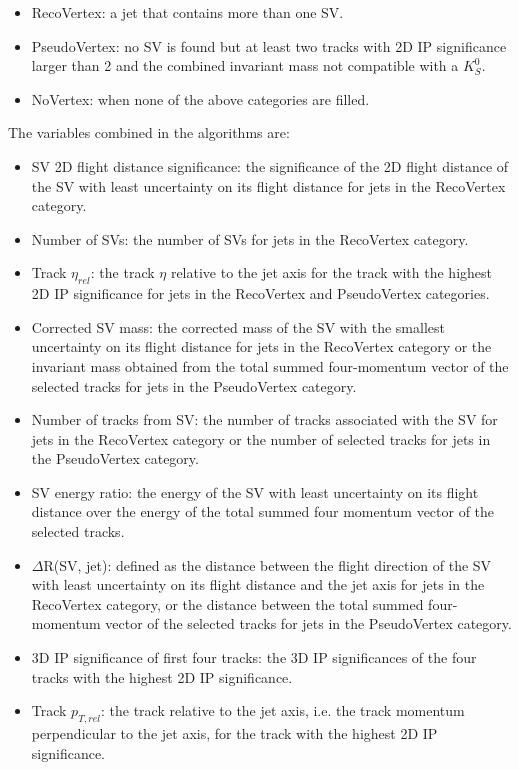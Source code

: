 \begin{itemize}
\item RecoVertex: a jet that contains more than one SV.
\item PseudoVertex: no SV is found but at least two tracks with 2D IP significance larger than 2 and the combined invariant mass not compatible with a $K_{S}^{0}$. 
\item NoVertex: when none of the above categories are filled. 
\end{itemize}
\newpara
\noindent\justify
The variables combined in the algorithms are: 
\begin{itemize}
\item SV 2D flight distance significance: the significance of the 2D flight distance of the SV with least uncertainty on its flight distance for jets in the RecoVertex category.
\item Number of SVs: the number of SVs for jets in the RecoVertex category.
\item Track $\eta_{rel}$: the track $\eta$ relative to the jet axis for the track with the highest 2D IP significance for jets in the RecoVertex and PseudoVertex categories.
\item Corrected SV mass: the corrected mass of the SV with the smallest uncertainty on its flight distance for jets in the RecoVertex category or the invariant mass obtained from the total summed four-momentum vector of the selected tracks for jets in the PseudoVertex category.
\item Number of tracks from SV: the number of tracks associated with the SV for jets in the RecoVertex category or the number of selected tracks for jets in the PseudoVertex category.
\item SV energy ratio: the energy of the SV with least uncertainty on its flight distance over the energy of the total summed four momentum vector of the selected tracks.
\item $\Delta$R(SV, jet): defined as the distance between the flight direction of the SV with least uncertainty on its flight distance and the jet axis for jets in the RecoVertex category, or the distance between the total summed four-momentum vector of the selected tracks for jets in the PseudoVertex category.
\item 3D IP significance of first four tracks: the 3D IP significances of the four tracks with the highest 2D IP significance.
\item Track $p_{T,rel}$: the track \pt relative to the jet axis, i.e. the track momentum perpendicular to the jet axis, for the track with the highest 2D IP significance.

\end{itemize}
